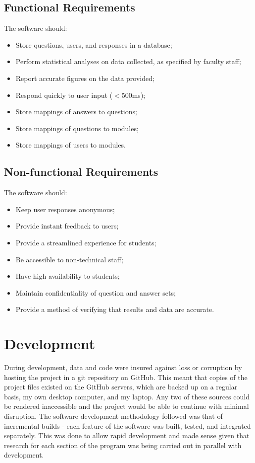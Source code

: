\documentclass[12pt,a4paper,twoside]{report}
\begin{document}
\subsection{Functional Requirements}
The software should:
\begin{itemize}
	\item Store questions, users, and responses in a database;
	\item Perform statistical analyses on data collected, as specified by faculty staff;
	\item Report accurate figures on the data provided;
	\item Respond quickly to user input ($<$500ms);
	\item Store mappings of answers to questions;
	\item Store mappings of questions to modules;
	\item Store mappings of users to modules.
\end{itemize}
\subsection{Non-functional Requirements}
The software should:
\begin{itemize}
	\item Keep user responses anonymous;
	\item Provide instant feedback to users;
	\item Provide a streamlined experience for students;
	\item Be accessible to non-technical staff;
	\item Have high availability to students;
	\item Maintain confidentiality of question and answer sets;
	\item Provide a method of verifying that results and data are accurate.
\end{itemize}

\section{Development}
During development, data and code were insured against loss or corruption by hosting the project in a git repository on GitHub. This meant that copies of the project files existed on the GitHub servers, which are backed up on a regular basis, my own desktop computer, and my laptop. Any two of these sources could be rendered inaccessible and the project would be able to continue with minimal disruption. The software development methodology followed was that of incremental builds - each feature of the software was built, tested, and integrated separately. This was done to allow rapid development and made sense given that research for each section of the program was being carried out in parallel with development.
\end{document}
